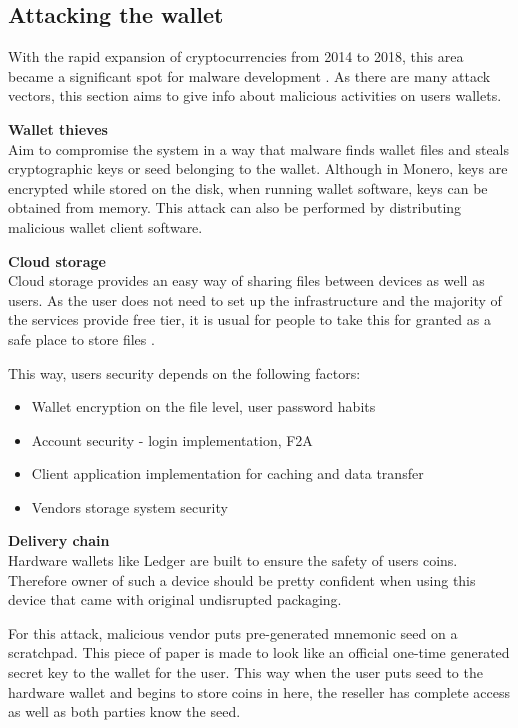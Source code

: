 \documentclass[
  printed, %
  table,   %
  nolof,     %
  nolot,     %
           oneside, color
]{fithesis3}
\begin{document}
\begin{itemize}
\begin{itemize}
\end{itemize}
\end{itemize} 

\subsection{Attacking the wallet}
With the rapid expansion of cryptocurrencies from 2014 to 2018, this area became a significant spot for malware development \cite{schaupp2018cryptocurrency}. As there are many attack vectors, this section aims to give info about malicious activities on users wallets.

\textbf{Wallet thieves}\\
Aim to compromise the system in a way that malware finds wallet files and steals cryptographic keys or seed belonging to the wallet. Although in Monero, keys are encrypted while stored on the disk, when running wallet software, keys can be obtained from memory. This attack can also be performed by distributing malicious wallet client software.

\textbf{Cloud storage}\\
Cloud storage provides an easy way of sharing files between devices as well as users. As the user does not need to set up the infrastructure and the majority of the services provide free tier, it is usual for people to take this for granted as a safe place to store files \cite{caviglione2017covert}.

This way, users security depends on the following factors:
\begin{itemize}\itemsep0em
\item Wallet encryption on the file level, user password habits
\item Account security - login implementation, F2A
\item Client application implementation for caching and data transfer
\item Vendors storage system security
\end{itemize} 

\textbf{Delivery chain}\\
Hardware wallets like Ledger are built to ensure the safety of users coins. Therefore owner of such a device should be pretty confident when using this device that came with original undisrupted packaging. 

For this attack, malicious vendor puts pre-generated mnemonic seed on a scratchpad. This piece of paper is made to look like an official one-time generated secret key to the wallet for the user. This way when the user puts seed to the hardware wallet and begins to store coins in here, the reseller has complete access as well as both parties know the seed.
\end{document}
